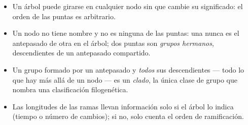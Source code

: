 \begin{proposition}\label{prop:g12:phylogenetic-trees:rules}
\begin{itemize}
  \item Un árbol puede girarse en cualquier nodo sin que cambie su
        significado: el orden de las puntas es arbitrario.
  \item Un nodo no tiene nombre y no es ninguna de las puntas: una
         nunca es el antepasado de otra  en el árbol; dos
        puntas son \emph{grupos hermanos}, descendientes de un
        antepasado compartido.
  \item Un grupo formado por un antepasado y \emph{todos} sus
        descendientes --- todo lo que hay más allá de un nodo --- es un
        \emph{clado}, la única clase de grupo que nombra
        una clasificación filogenética.
  \item Las longitudes de las ramas llevan información solo si el árbol
        lo indica (tiempo o número de cambios); si no, solo cuenta el
        orden de ramificación.
\end{itemize}
\end{proposition}
\admitted

